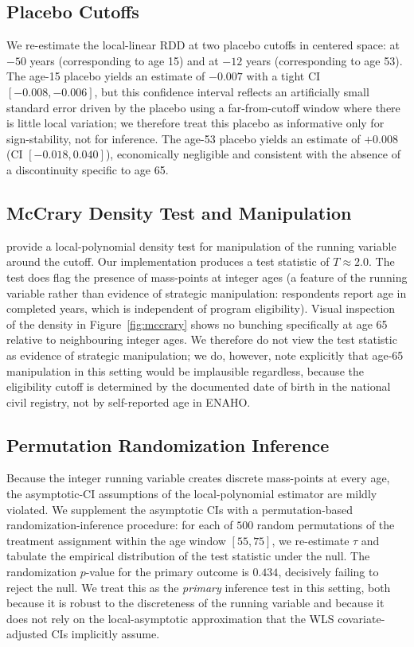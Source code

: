 \documentclass[12pt]{article}
\begin{document}
\subsection{Placebo Cutoffs}

We re-estimate the local-linear RDD at two placebo cutoffs in centered space: at $-50$ years (corresponding to age 15) and at $-12$ years (corresponding to age 53). The age-15 placebo yields an estimate of $-0.007$ with a tight CI $[-0.008, -0.006]$, but this confidence interval reflects an artificially small standard error driven by the placebo using a far-from-cutoff window where there is little local variation; we therefore treat this placebo as informative only for sign-stability, not for inference. The age-53 placebo yields an estimate of $+0.008$ (CI $[-0.018, 0.040]$), economically negligible and consistent with the absence of a discontinuity specific to age 65.

\subsection{McCrary Density Test and Manipulation}

\citet{cattaneo2018} provide a local-polynomial density test for manipulation of the running variable around the cutoff. Our implementation produces a test statistic of $T \approx 2.0$. The test does flag the presence of mass-points at integer ages (a feature of the running variable rather than evidence of strategic manipulation: respondents report age in completed years, which is independent of program eligibility). Visual inspection of the density in Figure~\ref{fig:mccrary} shows no bunching specifically at age 65 relative to neighbouring integer ages. We therefore do not view the test statistic as evidence of strategic manipulation; we do, however, note explicitly that age-65 manipulation in this setting would be implausible regardless, because the eligibility cutoff is determined by the documented date of birth in the national civil registry, not by self-reported age in ENAHO.

\subsection{Permutation Randomization Inference}

Because the integer running variable creates discrete mass-points at every age, the asymptotic-CI assumptions of the local-polynomial estimator are mildly violated. We supplement the asymptotic CIs with a permutation-based randomization-inference procedure: for each of $500$ random permutations of the treatment assignment within the age window $[55, 75]$, we re-estimate $\tau$ and tabulate the empirical distribution of the test statistic under the null. The randomization $p$-value for the primary outcome is $0.434$, decisively failing to reject the null. We treat this as the \emph{primary} inference test in this setting, both because it is robust to the discreteness of the running variable and because it does not rely on the local-asymptotic approximation that the WLS covariate-adjusted CIs implicitly assume.
\end{document}
